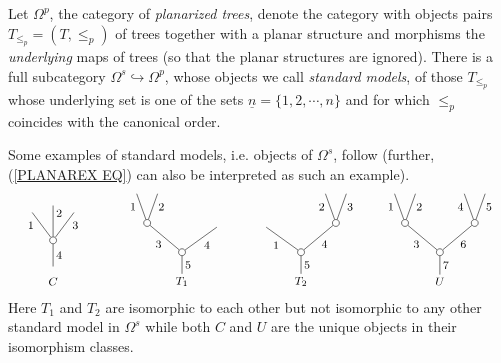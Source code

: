 \documentclass[a4paper,10pt]{article}%
\begin{document}
Let $\Omega^p$, the category of \textit{planarized trees}, denote the category with objects pairs $T_{\leq_p}=(T,\leq_p)$ of trees together with a planar structure  and morphisms the \textit{underlying} maps of trees (so that the planar structures are ignored).
There is a full subcategory $\Omega^s \hookrightarrow \Omega^p$, whose objects we call \textit{standard models}, of those $T_{\leq_p}$ whose underlying set is one of the sets $\underline{n} = \{1,2,\cdots,n\}$ and for which $\leq_p$ coincides with the canonical order. 
\begin{example}\label{STANDMODEL EX}
	Some examples of standard models, i.e. objects of $\Omega^s$, follow (further, (\ref{PLANAREX EQ}) can also be interpreted as such an example).
\begin{equation}\label{PLANAROMEGAEX1 EQ}
	\begin{tikzpicture}[grow=up,auto,level distance=2.1em,
	every node/.style = {font=\footnotesize,inner sep=2pt},
	dummy/.style={circle,draw,inner sep=0pt,minimum size=1.75mm}]
		\node at (-0.25,0) {$C$};
		\node at (-0.25,0.3) {}
			child{node [dummy] {}
				child[sibling distance = 1.5em,level distance= 2em]{
				edge from parent node [swap, near end] {$3$}}
				child[sibling distance = 1.5em,level distance= 2.5em]{
				edge from parent node [swap, near end] {$2$}}
				child[sibling distance = 1.5em,level distance= 2em]{
				edge from parent node [near end] {$1$}}
			edge from parent node [swap] {$4$}};
		\node at (3,0) {$T_1$}
			child{node [dummy] {}
				child[sibling distance = 5em, level distance=1.8em]{
				edge from parent node [swap] {$4$}}
				child[sibling distance = 5em]{node [dummy] {}
					child[sibling distance = 1.5em]{
					edge from parent node [swap,near end] {$2$}}
					child[sibling distance = 1.5em]{
					edge from parent node [near end] {$1$}}
				edge from parent node {$3$}}
			edge from parent node [swap] {$5$}};
		\node at (6,0) {$T_2$}
			child{node [dummy] {}
				child[sibling distance = 5em]{node [dummy] {}
					child[sibling distance = 1.5em]{
					edge from parent node [swap,near end] {$3$}}
					child[sibling distance = 1.5em]{
					edge from parent node [near end] {$2$}}
				edge from parent node [swap] {$4$}}
				child[sibling distance = 5em, level distance=1.8em]{
				edge from parent node {$1$}}
			edge from parent node [swap] {$5$}};
		\node at  (9.5,0) {$U$}
			child{node [dummy] {}
				child[sibling distance = 5em]{node [dummy] {}
					child[sibling distance = 1.5em]{
					edge from parent node [swap,near end] {$5$}}
					child[sibling distance = 1.5em]{
					edge from parent node [near end] {$4$}}
				edge from parent node [swap] {$6$}}
				child[sibling distance = 5em]{node [dummy] {}
					child[sibling distance = 1.5em]{
					edge from parent node [swap,near end] {$2$}}
					child[sibling distance = 1.5em]{
					edge from parent node [near end] {$1$}}
				edge from parent node {$3$}}
			edge from parent node [swap] {$7$}};
	\end{tikzpicture}
\end{equation}
Here $T_1$ and $T_2$ are isomorphic to each other but not isomorphic to any other standard model in $\Omega^s$ while both $C$ and $U$ are the unique objects in their isomorphism classes. 
\end{example}
\end{document}

